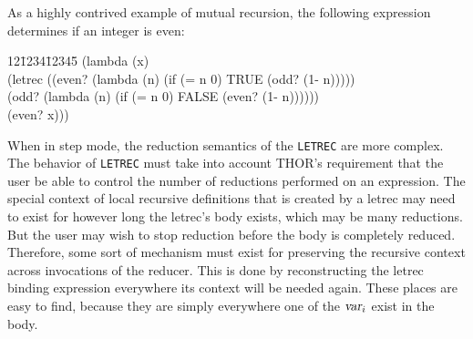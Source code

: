 	As a highly contrived example of mutual recursion, the following
expression determines if an integer is even:
\begin{tt}
\begin{tabbing}
12\=1234\=12345\=\kill
   (lambda (x)\\
\>        (letrec ((even? (lambda (n) (if (= n 0) TRUE (odd? (1- n)))))\\
\>\>\>               (odd? (lambda (n) (if (= n 0) FALSE (even? (1-
n))))))\\
\>\>			(even? x)))
\end{tabbing}
\end{tt}

	
	When in step mode, the reduction semantics of the {\tt LETREC} 
are more complex.  The behavior of {\tt LETREC} must take into account
THOR's requirement that the user be able to control the number of
reductions performed on an expression.
The special context of local recursive definitions that is created by
a letrec may need to exist for however long the letrec's
body exists, which may be many reductions. But the user may wish to stop
reduction before the body is completely reduced.
Therefore, some sort of 
mechanism must exist for preserving the recursive context across
invocations of the reducer.  This is done by reconstructing the letrec
binding expression everywhere its context will be needed again.  These
places are easy to find, because they are simply everywhere one of the 
${\mbox{\sl var}}_i$ exist in the body.  


